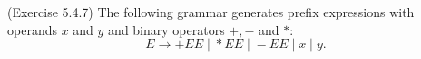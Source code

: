 \documentclass[10pt]{homework}
\begin{document}

\begin{problem} (Exercise 5.4.7) The following grammar generates prefix
  expressions with operands $x$ and $y$ and binary operators ${+}, {-}$ and $*$:
  \begin{equation*}
    E \rightarrow {+}EE \;|\; {*}EE \;|\; {-}EE \;|\; x \;|\; y.
  \end{equation*}
\end{problem}
\end{document}
